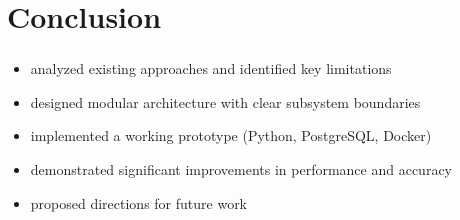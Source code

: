 
\section{Conclusion}

\begin{frame}
  \frametitle{\insertsection}

  \begin{itemize}
    \item analyzed existing approaches and identified key limitations
    \item designed modular architecture with clear subsystem boundaries
    \item implemented a working prototype (Python, PostgreSQL, Docker)
    \item demonstrated significant improvements in performance and accuracy
    \item proposed directions for future work
  \end{itemize}
\end{frame}

